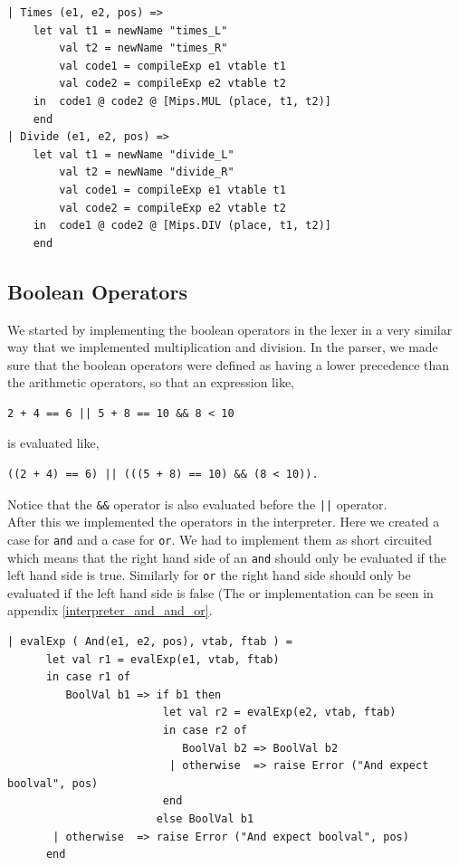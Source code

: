 \documentclass[11pt]{article}
\begin{document}
    \begin{lstlisting}[firstnumber=240]
| Times (e1, e2, pos) =>
    let val t1 = newName "times_L"
        val t2 = newName "times_R"
        val code1 = compileExp e1 vtable t1
        val code2 = compileExp e2 vtable t2
    in  code1 @ code2 @ [Mips.MUL (place, t1, t2)]
    end
| Divide (e1, e2, pos) =>
    let val t1 = newName "divide_L"
        val t2 = newName "divide_R"
        val code1 = compileExp e1 vtable t1
        val code2 = compileExp e2 vtable t2
    in  code1 @ code2 @ [Mips.DIV (place, t1, t2)]
    end
    \end{lstlisting}

    \subsection{Boolean Operators}
    We started by implementing the boolean operators in the lexer in a very
    similar way that we implemented multiplication and division.  In the parser,
    we made sure that the boolean operators were defined as having a lower
    precedence than the arithmetic operators, so that an expression like,

    \begin{lstlisting}[]
        2 + 4 == 6 || 5 + 8 == 10 && 8 < 10
    \end{lstlisting}

    is evaluated like,

    \begin{lstlisting}[]
        ((2 + 4) == 6) || (((5 + 8) == 10) && (8 < 10)).
    \end{lstlisting}

    Notice that the \texttt{\&\&} operator is also evaluated before the
    \texttt{||} operator. \\

    After this we implemented the operators in the interpreter.  Here we created
    a case for \texttt{and} and a case for \texttt{or}.  We had to implement
    them as short circuited which means that the right hand side of an
    \texttt{and} should only be evaluated if the left hand side is true.
    Similarly for \texttt{or} the right hand side should only be evaluated if
    the left hand side is false (The or implementation can be seen in appendix
    \ref{interpreter_and_and_or}.

    \begin{lstlisting}[firstnumber=216]
| evalExp ( And(e1, e2, pos), vtab, ftab ) =
      let val r1 = evalExp(e1, vtab, ftab)
      in case r1 of
         BoolVal b1 => if b1 then
                        let val r2 = evalExp(e2, vtab, ftab)
                        in case r2 of
                           BoolVal b2 => BoolVal b2
                         | otherwise  => raise Error ("And expect boolval", pos)
                        end
                       else BoolVal b1
       | otherwise  => raise Error ("And expect boolval", pos)
      end

    \end{lstlisting}
\end{document}
